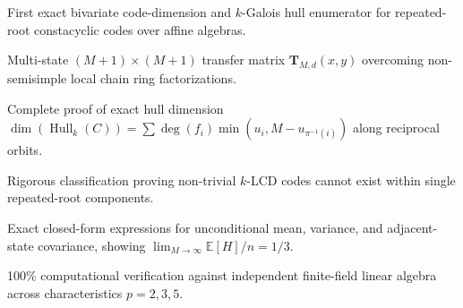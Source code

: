 \begin{highlights}
\item First exact bivariate code-dimension and $k$-Galois hull enumerator for repeated-root constacyclic codes over affine algebras.
\item Multi-state $(M+1) \times (M+1)$ transfer matrix $\mathbf{T}_{M, d}(x, y)$ overcoming non-semisimple local chain ring factorizations.
\item Complete proof of exact hull dimension $\dim(\operatorname{Hull}_k(C)) = \sum \deg(f_i) \min(u_i, M - u_{\pi^{-1}(i)})$ along reciprocal orbits.
\item Rigorous classification proving non-trivial $k$-LCD codes cannot exist within single repeated-root components.
\item Exact closed-form expressions for unconditional mean, variance, and adjacent-state covariance, showing $\lim_{M \to \infty} \mathbb{E}[H]/n = 1/3$.
\item 100\% computational verification against independent finite-field linear algebra across characteristics $p=2, 3, 5$.
\end{highlights}
